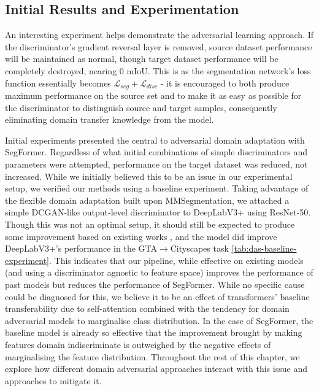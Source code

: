 \documentclass[a4paper,12pt]{report}
\begin{document}
\subsection{Initial Results and Experimentation}
An interesting experiment helps demonstrate the adversarial learning approach. If the discriminator's gradient reversal layer is removed, source dataset performance will be maintained as normal, though target dataset performance will be completely destroyed, nearing 0 mIoU. This is as the segmentation network's loss function essentially becomes $\mathcal{L}_{seg} + \mathcal{L}_{disc}$ - it is encouraged to both produce maximum performance on the source set and to make it as easy as possible for the discriminator to distinguish source and target samples, consequently eliminating domain transfer knowledge from the model.

Initial experiments presented the central to adversarial domain adaptation with SegFormer. Regardless of what initial combinations of simple discriminators and parameters were attempted, performance on the target dataset was reduced, not increased. While we initially believed this to be an issue in our experimental setup, we verified our methods using a baseline experiment. Taking advantage of the flexible domain adaptation built upon MMSegmentation, we attached a simple DCGAN-like output-level discriminator to DeepLabV3+ using ResNet-50. Though this was not an optimal setup, it should still be expected to produce some improvement based on existing works \cite{tsai_learning_2020}, and the model did improve DeepLabV3+'s performance in the GTA$\rightarrow$Cityscapes task \ref{tab:das-baseline-experiment}. This indicates that our pipeline, while effective on existing models (and using a discriminator agnostic to feature space) improves the performance of past models but reduces the performance of SegFormer. While no specific cause could be diagnosed for this, we believe it to be an effect of transformers' baseline transferability due to self-attention \cite{dosovitskiy_image_2021} combined with the tendency for domain adversarial models to marginalise class distribution. In the case of SegFormer, the baseline model is already so effective that the improvement brought by making features domain indiscriminate is outweighed by the negative effects of marginalising the feature distribution. Throughout the rest of this chapter, we explore how different domain adversarial approaches interact with this issue and approaches to mitigate it.
\end{document}
